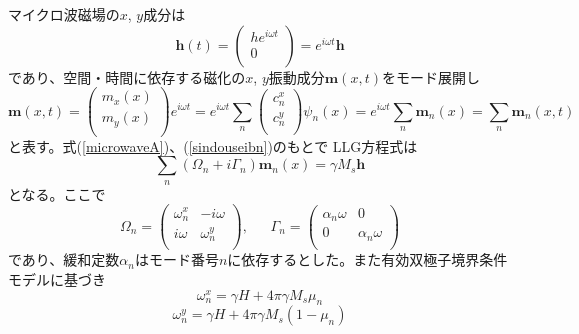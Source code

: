 マイクロ波磁場の$x$, $y$成分は
\begin{equation}
\bm{h}(t) = \left( {\begin{array}{*{20}{c}}
   {h{e^{i\omega t}}}  \\
   0  \\
\end{array}} \right)= {e^{i\omega t}} \bm{h}\label{microwaveA}
\end{equation}
であり、空間・時間に依存する磁化の$x$, $y$振動成分$\bm{m}(x, t)$をモード展開し
\begin{equation}
\bm{m}(x,t) = \left( {\begin{array}{*{20}{c}}
   {{m_x}(x)}  \\
   {{m_y}(x)}  \\
\end{array}} \right){e^{i\omega t}} = {e^{i\omega t}}\sum\limits_n {\left( {\begin{array}{*{20}{c}}
   {c_n^x}  \\
   {c_n^y}  \\
\end{array}} \right)} {\psi _n}(x)= {e^{i\omega t}}\sum\limits_n \bm{m}_n(x)=\sum\limits_n \bm{m}_n(x,t)\label{sindouseibn}
\end{equation}
と表す。式(\ref{microwaveA})、(\ref{sindouseibn})のもとで
LLG方程式は
\begin{equation}
\sum\limits_n {\left( {{\Omega _n} + i{\Gamma _n}} \right)} {\bm{m}_n}(x) = \gamma M_s \bm{h}\label{SPLLG}
\end{equation}
となる。ここで
\begin{equation}
{\Omega _n} = \left( {\begin{array}{*{20}{c}}
   {\omega _n^x} & { - i\omega }  \\
   {i\omega } & {\omega _n^y}  \\
\end{array}} \right),\:\:\:\:\:\:\:{\Gamma _n} = \left( {\begin{array}{*{20}{c}}
   {{\alpha _n}\omega } & 0  \\
   0 & {{\alpha _n}\omega }  \\
\end{array}} \right)
\end{equation}
であり、緩和定数$\alpha_n$はモード番号$n$に依存するとした。また有効双極子境界条件モデルに基づき
\begin{equation}
 \omega _n^x = \gamma H + 4\pi \gamma {M_s}{\mu _n} \label{mu_nx}
\end{equation}
\begin{equation}
 \omega _n^y=\gamma H + 4\pi \gamma {M_s}(1 - {\mu _n}) \label{mu_ny}
\end{equation}
